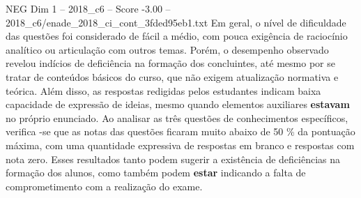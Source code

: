 \begin{textsample}{NEG Dim 1 – 2018\_c6 – Score -3.00 – 2018\_c6/enade\_2018\_ci\_cont\_3fded95eb1.txt}
Em geral, o nível de dificuldade das questões foi considerado de fácil a médio, com pouca exigência de raciocínio analítico ou articulação com outros temas.
Porém, o desempenho observado revelou indícios de deficiência na formação dos concluintes, até mesmo por se tratar de conteúdos básicos do curso, que não exigem atualização normativa e teórica.
Além disso, as respostas redigidas pelos estudantes indicam baixa capacidade de expressão de ideias, mesmo quando elementos auxiliares \textbf{estavam} no próprio enunciado.
Ao analisar as três questões de conhecimentos específicos, verifica -se que as notas das questões ficaram muito abaixo de 50 \% da pontuação máxima, com uma quantidade expressiva de respostas em branco e respostas com nota zero.
Esses resultados tanto podem sugerir a existência de deficiências na formação dos alunos, como também podem \textbf{estar} indicando a falta de comprometimento com a realização do exame.

\end{textsample}
